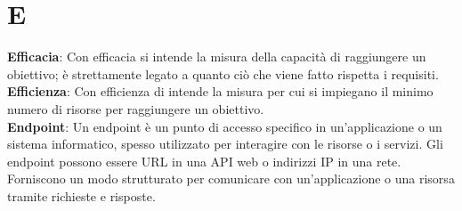 \section{E}
\textbf{Efficacia}: Con efficacia si intende la misura della capacità di raggiungere un obiettivo; è strettamente
legato a quanto ciò che viene fatto rispetta i requisiti.\\
\textbf{Efficienza}: Con efficienza di intende la misura per cui si impiegano il minimo numero di risorse per
raggiungere un obiettivo.\\
\textbf{Endpoint}: Un endpoint è un punto di accesso specifico in un'applicazione o un sistema informatico, spesso utilizzato per interagire con le risorse o i servizi. Gli endpoint possono essere URL in una API web o indirizzi IP in una rete. Forniscono un modo strutturato per comunicare con un'applicazione o una risorsa tramite richieste e risposte.\\